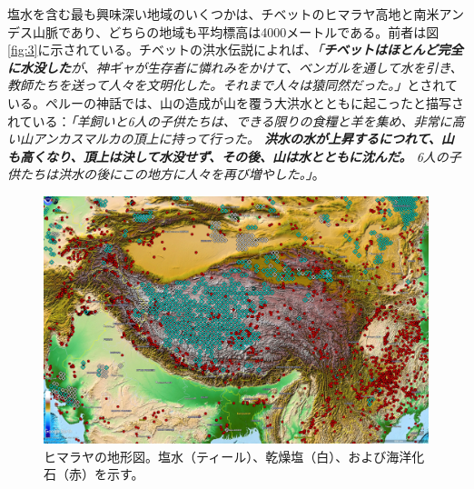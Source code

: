 \documentclass[10pt,twocolumn,letterpaper]{article}
\begin{document}


塩水を含む最も興味深い地域のいくつかは、チベットのヒマラヤ高地と南米アンデス山脈であり、どちらの地域も平均標高は4000メートルである。前者は図\ref{fig:3}に示されている。チベットの洪水伝説によれば、\textit{「\textbf{チベットはほとんど完全に水没した}が、神ギャが生存者に憐れみをかけて、ベンガルを通して水を引き、教師たちを送って人々を文明化した。それまで人々は猿同然だった。」}\cite{3}とされている。ペルーの神話では、山の造成が山を覆う大洪水とともに起こったと描写されている：\textit{「羊飼いと6人の子供たちは、できる限りの食糧と羊を集め、非常に高い山アンカスマルカの頂上に持って行った。 \textbf{洪水の水が上昇するにつれて、山も高くなり、頂上は決して水没せず、その後、山は水とともに沈んだ。} 6人の子供たちは洪水の後にこの地方に人々を再び増やした。」}\cite{3}。

\begin{figure}[t]
\begin{center}
   \includegraphics[width=1\linewidth]{tibet.jpg}
\end{center}
   \caption{ヒマラヤの地形図。塩水（ティール）、乾燥塩（白）、および海洋化石（赤）を示す\cite{15,16,86,87}。}
\label{fig:3}
\label{fig:onecol}
\end{figure}
\end{document}
